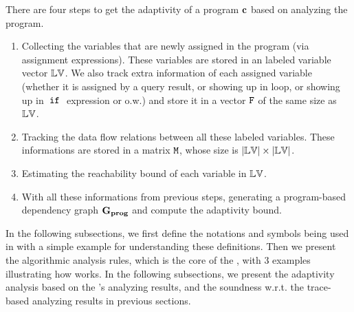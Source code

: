 %
%
There are four steps to get the adaptivity of a program ${\boldsymbol{\mathbf{c}}}$ based on analyzing the program. 
\begin{enumerate}
\item Collecting the variables that are newly assigned in the program (via assignment expressions). These variables are stored in an labeled variable vector $\mathbb{LV}$. 
We also track extra information of each assigned variable (whether it is assigned by a query result, or showing up in loop, or showing up in $\;\mathtt{if}\;$ expression or o.w.) and store it in a vector $\mathtt{F}$ of the same size as $\mathbb{LV}$.
%
\item Tracking the data flow relations between all these labeled variables. These informations are stored in a matrix $\mathtt{M}$, whose size is $|\mathbb{LV}| \times |\mathbb{LV}|$. 
%
\item Estimating the reachability bound of each variable in $\mathbb{LV}$.
%
\item With all these informations from previous steps, generating a program-based dependency graph $\mathtt{\bf{G_{prog}}}$ and compute the adaptivity bound.
\end{enumerate}

In the following subsections, 
we first define the notations and symbols being used in \THESYSTEM  with a simple example for understanding these definitions. 
Then we present the algorithmic analysis rules, which is the core of the \THESYSTEM, with
3 examples illustrating how \THESYSTEM  works.
In the following subsections, we present the adaptivity analysis based on the \THESYSTEM's analyzing results, and the soundness w.r.t. the trace-based analyzing results in previous sections.

